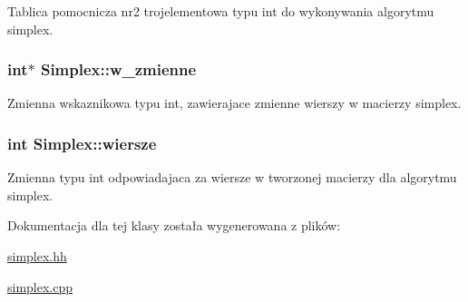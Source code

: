 \-Tablica pomocnicza nr2 trojelementowa typu int do wykonywania algorytmu simplex. 

\hypertarget{class_simplex_a7e15401f583fe525e4ad3c6b4b78a7f5}{
\subsubsection[{w\-\_\-zmienne}]{\setlength{\rightskip}{0pt plus 5cm}int$\ast$ {\bf \-Simplex\-::w\-\_\-zmienne}}}\label{class_simplex_a7e15401f583fe525e4ad3c6b4b78a7f5}


\-Zmienna wskaznikowa typu int, zawierajace zmienne wierszy w macierzy simplex. 

\hypertarget{class_simplex_a20249757e630443b5a5580c6e1787a5e}{
\subsubsection[{wiersze}]{\setlength{\rightskip}{0pt plus 5cm}int {\bf \-Simplex\-::wiersze}}}\label{class_simplex_a20249757e630443b5a5580c6e1787a5e}


\-Zmienna typu int odpowiadajaca za wiersze w tworzonej macierzy dla algorytmu simplex. 



\-Dokumentacja dla tej klasy została wygenerowana z plików\-:\begin{DoxyCompactItemize}
\item 
\hyperlink{simplex_8hh}{simplex.\-hh}\item 
\hyperlink{simplex_8cpp}{simplex.\-cpp}\end{DoxyCompactItemize}
